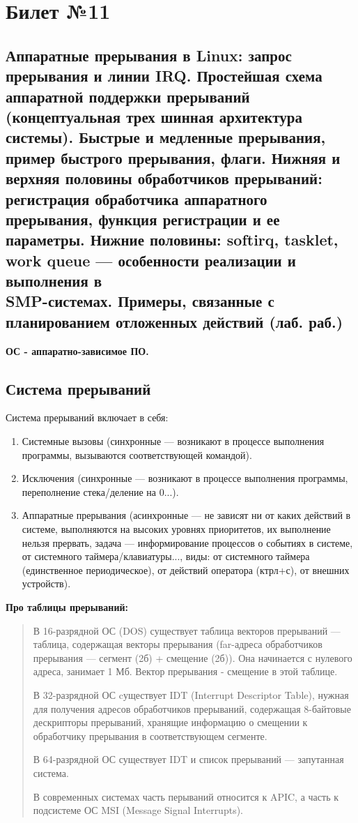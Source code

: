 \chapter{Билет №11}

\section*{Аппаратные прерывания в Linux: запрос прерывания и линии IRQ. Простейшая схема аппаратной поддержки прерываний (концептуальная трех шинная архитектура системы). Быстрые и медленные прерывания, пример быстрого прерывания, флаги. Нижняя и верхняя половины обработчиков прерываний: регистрация обработчика аппаратного прерывания, функция регистрации и ее параметры. Нижние половины: softirq, tasklet, work queue — особенности реализации и выполнения в \\ SMP-системах. Примеры, связанные с планированием отложенных действий (лаб. раб.)}

\textbf{ОС - аппаратно-зависимое ПО.}

\section{Система прерываний}

Система прерываний включает в себя:
\begin{enumerate}
  \item Системные вызовы (синхронные --- возникают в процессе выполнения программы, вызываются соответствующей командой).
  \item Исключения (синхронные --- возникают в процессе выполнения программы, переполнение стека/деление на 0...).
  \item Аппаратные прерывания (асинхронные --- не зависят ни от каких действий в системе, выполняются на высоких уровнях приоритетов, их выполнение нельзя прервать, задача --- информирование процессов о событиях в системе, от системного таймера/клавиатуры..., виды: от системного таймера (единственное периодическое), от действий оператора (ктрл+с), от внешних устройств).
\end{enumerate}

\textbf{Про таблицы прерываний:}

\begin{quote}  
  В 16-разрядной ОС (DOS) существует таблица векторов прерываний --- таблица, содержащая векторы прерывания (far-адреса обработчиков прерывания --- сегмент (2б) + смещение (2б)). Она начинается с нулевого адреса, занимает 1 Мб. Вектор прерывания - смещение в этой таблице.
  
  В 32-разрядной ОС cуществует IDT (Interrupt Descriptor Table), нужная для получения адресов обработчиков прерываний, содержащая 8-байтовые дескрипторы прерываний, хранящие информацию о смещении к обработчику прерывания в соответствующем сегменте.
  
  В 64-разрядной ОС существует IDT и список прерываний --- запутанная система.
  
  В современных системах часть перываний относится к APIC, а часть к подсистеме ОС MSI (Message Signal Interrupts).
\end{quote}

